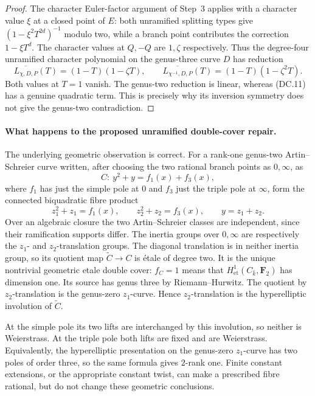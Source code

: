 \documentclass[11pt,a4paper]{article}
\begin{document}
\begin{proof}
The character Euler-factor argument of Step~3 applies
with a character value $\xi$ at a closed point of $E$:
both unramified splitting types give
$(1-\xi^2T^{2d})^{-1}$ modulo two, while a branch point
contributes the correction $1-\xi T^d$.
The character values at $Q,-Q$ are $1,\zeta$ respectively.
Thus the degree-four unramified character polynomial on
the genus-three curve $D$ has reduction
\[
       \overline{L_{\chi,D,P}}(T)=(1-T)(1-\zeta T),
       \qquad
       \overline{L_{\chi^{-1},D,P}}(T)
                                      =(1-T)(1-\zeta^2T).
\tag{DC.11}
\]
Both values at $T=1$ vanish.  The genus-two reduction is
linear, whereas (DC.11) has a genuine quadratic term.
This is precisely why its inversion symmetry does not
give the genus-two contradiction.
\end{proof}

\paragraph{What happens to the proposed unramified double-cover repair.}
The underlying geometric observation is correct.
For a rank-one genus-two Artin--Schreier curve written,
after choosing the two rational branch points as $0,\infty$,
as
\[
 C:\ y^2+y=f_1(x)+f_3(x),
\]
where $f_1$ has just the simple pole at $0$ and $f_3$
just the triple pole at $\infty$, form the connected
biquadratic fibre product
\[
 z_1^2+z_1=f_1(x),\qquad z_2^2+z_2=f_3(x),
                         \qquad y=z_1+z_2.
\tag{DC.12}
\]
Over an algebraic closure the two Artin--Schreier classes
are independent, since their ramification supports differ.
The inertia groups over $0,\infty$ are respectively the
$z_1$- and $z_2$-translation groups.
The diagonal translation is in neither inertia group,
so its quotient map $\widetilde C\to C$ is \'etale of
degree two.  It is the unique nontrivial geometric etale
double cover: $f_C=1$ means that
$H^1_{\mathrm{et}}(C_{\bar k},\mathbf F_2)$ has dimension one.
Its source has genus three by Riemann--Hurwitz.
The quotient by $z_2$-translation is
the genus-zero $z_1$-curve.  Hence $z_2$-translation is
the hyperelliptic involution of $\widetilde C$.

At the simple pole its two lifts are interchanged by
this involution, so neither is Weierstrass.  At the
triple pole both lifts are fixed and are Weierstrass.
Equivalently, the hyperelliptic presentation on the
genus-zero $z_1$-curve has two poles of order three,
so the same formula gives $2$-rank one.
Finite constant extensions, or the appropriate constant
twist, can make a prescribed fibre rational, but do not
change these geometric conclusions.
\end{document}
